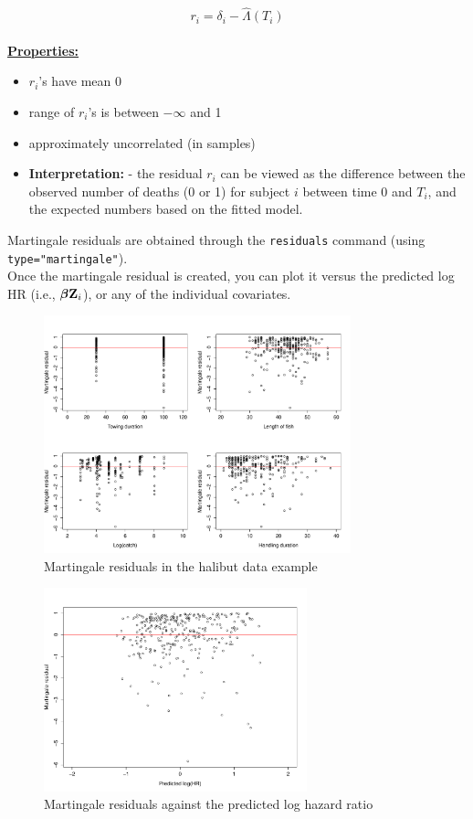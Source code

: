\documentclass[11pt]{book}
\newcommand{\bfbeta}{{\mbox{\boldmath$\beta$}}}
\newcommand{\bfZ}{{\mbox{{\bf Z}}}}
\begin{document}
\[ r_i = \delta_i - \hat{\Lambda}(T_i) \]
~\\
\underline{\bf Properties:}
\begin{itemize}
\item $r_i$'s have mean 0
\item range of $r_i$'s is between $-\infty$ and 1
\item approximately uncorrelated (in  samples)
\item {\bf Interpretation:} - the residual $r_i$ can be viewed
as the difference between the observed number of deaths (0 or 1)
for subject $i$ between time 0 and $T_i$, and the expected numbers
based on the fitted model.
\end{itemize}
\noindent
Martingale residuals are obtained through the {\tt residuals} command (using {\tt type="martingale"}).
\\[2ex]
Once the martingale residual is created, you can plot it versus the
predicted log HR (i.e., $\bfbeta \bfZ_i$), or any of the individual
covariates.
\begin{figure}[h]
\caption{Martingale residuals in the halibut data example}
\centerline{\includegraphics[width=3.5in]{mart_res.pdf}}
\end{figure}
\begin{figure}[h]
\caption{Martingale residuals against the predicted log hazard ratio}
\centerline{\includegraphics[width=3in]{martres_pred.pdf}}
\end{figure}
\end{document}
